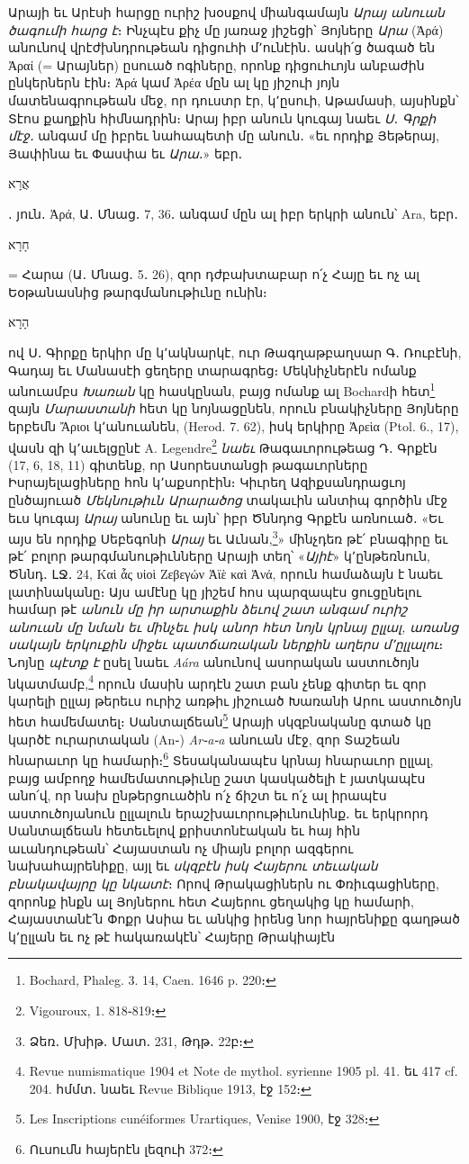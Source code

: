 \documentclass{article}
\begin{document}
{Արայի եւ Արէսի հարցը ուրիշ խօսքով միանգամայն \emph{Արայ անուան ծագումի հարց է}։ Ինչպէս քիչ մը յառաջ յիշեցի՝ Յոյները \emph{Արա} (Ἀρά) անունով վրէժխնդրութեան դիցուհի մ՚ունէին․ ասկի՛ց ծագած են Ἀραί (= Արայներ) ըսուած ոգիները, որոնք դիցուհւոյն անբաժին ընկերներն էին։ Ἀρά կամ Ἀρέα մըն ալ կը յիշուի յոյն մատենագրութեան մեջ, որ դուստր էր, կ՚ըսուի, Աթամասի, այսինքն՝ Տէոս քաղքին հիմնադրին։ Արայ իբր անուն կուգայ նաեւ \emph{Ս․ Գրքի մէջ․} անգամ մը իբրեւ նահապետի մը անուն․ «եւ որդիք Յեթերայ, Յափինա եւ Փասփա եւ \emph{Արա․}» եբր․ \begin{hebrewfont}אֲרָא\end{hebrewfont}․ յուն․ Ἀρά, Ա․ Մնաց․ 7, 36․ անգամ մըն ալ իբր երկրի անուն՝ Ara, եբր․ \begin{hebrewfont}חָרָא\end{hebrewfont} = Հարա (Ա․ Մնաց․ 5․ 26), զոր դժբախտաբար ո՛չ Հայը եւ ոչ ալ Եօթանասնից թարգմանութիւնը ունին։ \begin{hebrewfont}הָרָא\end{hebrewfont} ով Ս․ Գիրքը երկիր մը կ՚ակնարկէ, ուր Թագղաթբաղսար Գ․ Ռուբէնի, Գադայ եւ Մանասէի ցեղերը տարագրեց։ Մեկնիչներէն ոմանք անուամբս \emph{Խառան} կը հասկընան, բայց ոմանք ալ Bochardի հետ\footnote{Bochard, Phaleg. 3. 14, Caen. 1646 p. 220։} զայն \emph{Մարաստանի} հետ կը նոյնացընեն, որուն բնակիչները Յոյները երբեմն Ἄριοι կ՚անուանեն, (Herod. 7. 62), իսկ երկիրը Ἀρεὶα (Ptol. 6., 17), վասն զի կ՚աւելցընէ A. Legendre\footnote{Vigouroux, 1. 818֊819։} \emph{նաեւ} Թագաւորութեաց Դ․ Գրքէն (17, 6, 18, 11) գիտենք, որ Ասորեստանցի թագաւորները Իսրայելացիները հոն կ՚աքսորէին։ Կիւրեղ Ազիքսանդրացւոյ ընծայուած \emph{Մեկնութիւն Արարածոց} տակաւին անտիպ գործին մէջ եւս կուգայ \emph{Արայ} անունը եւ այն՝ իբր Ծննդոց Գրքէն առնուած․ «Եւ այս են որդիք Սեբեգոնի \emph{Արայ} եւ Աւնան,\footnote{Ձեռ․ Մխիթ․ Մատ․ 231, Թդթ․ 22բ։}» մինչդեռ թէ՛ բնագիրը եւ թէ՛ բոլոր թարգմանութիւնները Արայի տեղ՝ «\emph{Այիէ}» կ՚ընթեռնուն, Ծննդ․ ԼՋ․ 24, Καὶ ἇς υἱοὶ Ζεβεγών Ἀϊὲ καὶ Ἀνά, որուն համաձայն է նաեւ լատինականը։ Այս ամէնը կը յիշեմ հոս պարզապէս ցուցընելու համար թէ \emph{անուն մը իր արտաքին ձեւով շատ անգամ ուրիշ անուան մը նման եւ մինչեւ իսկ անոր հետ նոյն կրնայ ըլլալ, առանց սակայն երկուքին միջեւ պատճառական ներքին աղերս մ՚ըլլալու}։ Նոյնը \emph{պէտք է} ըսել նաեւ \emph{Aára} անունով ասորական աստուծոյն նկատմամբ,\footnote{Revue numismatique 1904 et Note de mythol. syrienne 1905 pl. 41. եւ 417 cf. 204. հմմտ․ նաեւ Revue Biblique 1913, էջ 152։} որուն մասին արդէն շատ բան չենք գիտեր եւ զոր կարելի ըլլայ թերեւս ուրիշ առթիւ յիշուած Խառանի Արու աստուծոյն հետ համեմատել։ Սանտալճեան\footnote{Les Inscriptions cunéiformes Urartiques, Venise 1900, էջ 328։} Արայի սկզբնականը գտած կը կարծէ ուրարտական (An֊) \emph{Ar֊a֊a} անուան մէջ, զոր Տաշեան հնարաւոր կը համարի։\footnote{Ուսումն հայերէն լեզուի 372։} Տեսականապէս կրնայ հնարաւոր ըլլալ, բայց ամբողջ համեմատութիւնը շատ կասկածելի է յատկապէս անո՛վ, որ նախ ընթերցուածին ո՛չ ճիշտ եւ ո՛չ ալ իրապէս աստուծոյանուն ըլլալուն երաշխաւորութիւնունինք․ եւ երկրորդ Սանտալճեան հետեւելով քրիստոնէական եւ հայ հին աւանդութեան՝ Հայաստան ոչ միայն բոլոր ազգերու նախահայրենիքը, այլ եւ \emph{սկզբէն իսկ Հայերու տեւական բնակավայրը կը նկատէ}։ Որով Թրակացիներն ու Փռիւգացիները, զորոնք ինքն ալ Յոյներու հետ Հայերու ցեղակից կը համարի, Հայաստանէ՛ն Փոքր Ասիա եւ անկից իրենց նոր հայրենիքը գաղթած կ՚ըլլան եւ ոչ թէ հակառակէն՝ Հայերը Թրակիայէն }
\end{document}
